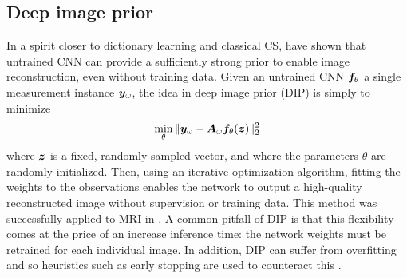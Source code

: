 \subsection{Deep image prior}
In a spirit closer to dictionary learning and classical CS, \citet{ulyanov2018deep} have shown that untrained CNN can provide a sufficiently strong prior to enable image reconstruction, even without training data. Given an untrained CNN ${\bm{f}}_\theta$ a single measurement instance ${\bm{y}}_\omega$, the idea in deep image prior (DIP) is simply to minimize 
\begin{equation}
    \min_\theta \|{\bm{y}}_\omega - {\bm{A}}_\omega {\bm{f}}_\theta({\bm{z}})\|_2^2
\end{equation}
where ${\bm{z}}$ is a fixed, randomly sampled vector, and where the parameters $\theta$ are randomly initialized. Then, using an iterative optimization algorithm, fitting the weights to the observations enables the network to output a high-quality reconstructed image without supervision or training data. This method was successfully applied to MRI in  \citep{darestani2021accelerated,yoo2021time}. A common pitfall of DIP is that this flexibility comes at the price of an increase inference time: the network weights must be retrained for each individual image. In addition, DIP can suffer from overfitting and so heuristics such as early stopping are used to counteract this \citep{ulyanov2018deep,sun2021plug}. 

